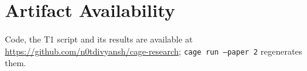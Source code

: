 \documentclass[conference]{IEEEtran}
\begin{document}
\section*{Artifact Availability}
Code, the T1 script and its results are available at \url{https://github.com/n0tdivyansh/cage-research};
\texttt{cage run --paper 2} regenerates them.



\end{document}
